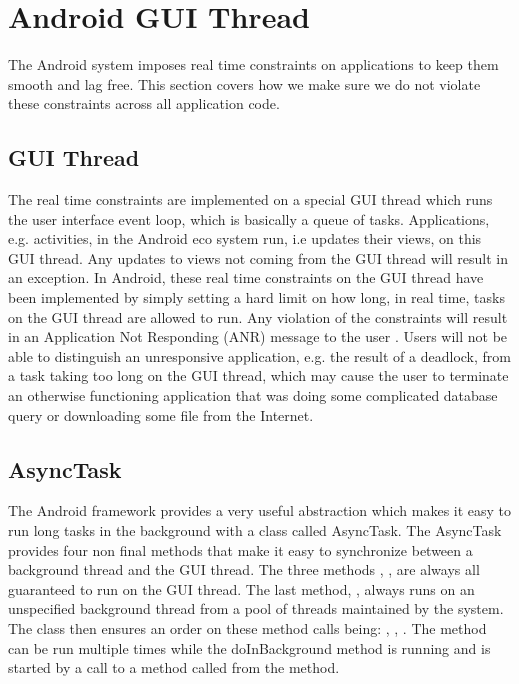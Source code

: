 
\section{Android GUI Thread}
\label{sec:gui_thread_async_task}

The Android system imposes real time constraints on applications to keep them smooth and lag free. This section covers how we make sure we do not violate these constraints across all application code.

\subsection{GUI Thread}
The real time constraints are implemented on a special GUI thread which runs the user interface event loop, which is basically a queue of tasks. Applications, e.g. activities, in the Android eco system run, i.e updates their views, on this GUI thread. Any updates to views not coming from the GUI thread will result in an exception. In Android, these real time constraints on the GUI thread have been implemented by simply setting a hard limit on how long, in real time, tasks on the GUI thread are allowed to run. Any violation of the constraints will result in an Application Not Responding (ANR) message to the user \parencite{android_avoid_anr}. Users will not be able to distinguish an unresponsive application, e.g. the result of a deadlock, from a task taking too long on the GUI thread, which may cause the user to terminate an otherwise functioning application that was doing some complicated database query or downloading some file from the Internet. 

\subsection{AsyncTask}

The Android framework provides a very useful abstraction which makes it easy to run long tasks in the background with a class called AsyncTask. The AsyncTask provides four non final methods that make it easy to synchronize between a background thread and the GUI thread. The three methods , ,  are always all guaranteed to run on the GUI thread. The last method, , always runs on an unspecified background thread from a pool of threads maintained by the system. The class then ensures an order on these method calls being: , , . The  method can be run multiple times while the doInBackground method is running and is started by a call to a method called  from the  method.  

